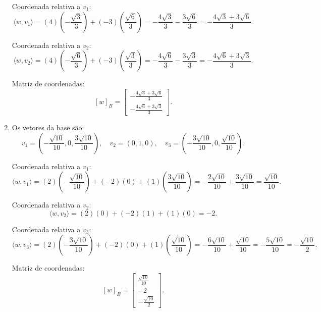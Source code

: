\begin{resolution}
\begin{enumerate}[label=\alph*)]
          Coordenada relativa a \( v_1 \):
          \[
            \langle w, v_1 \rangle = \left(4\right)\left(-\frac{\sqrt{3}}{3}\right) + \left(-3\right)\left(\frac{\sqrt{6}}{3}\right) = -\frac{4\sqrt{3}}{3} - \frac{3\sqrt{6}}{3} = -\frac{4\sqrt{3} + 3\sqrt{6}}{3}.
          \]

          Coordenada relativa a \( v_2 \):
          \[
            \langle w, v_2 \rangle = \left(4\right)\left(-\frac{\sqrt{6}}{3}\right) + \left(-3\right)\left(\frac{\sqrt{3}}{3}\right) = -\frac{4\sqrt{6}}{3} - \frac{3\sqrt{3}}{3} = -\frac{4\sqrt{6} + 3\sqrt{3}}{3}.
          \]

          Matriz de coordenadas:
          \[
            [w]_B = \begin{bmatrix}
              -\frac{4\sqrt{3} + 3\sqrt{6}}{3} \\[8pt]
              -\frac{4\sqrt{6} + 3\sqrt{3}}{3}
            \end{bmatrix}.
          \]

    \item Os vetores da base são:
          \[
            v_1 = \left(-\frac{\sqrt{10}}{10}, 0, \frac{3\sqrt{10}}{10}\right), \quad v_2 = (0, 1, 0), \quad v_3 = \left(-\frac{3\sqrt{10}}{10}, 0, \frac{\sqrt{10}}{10}\right).
          \]

          Coordenada relativa a \( v_1 \):
          \[
            \langle w, v_1 \rangle = \left(2\right)\left(-\frac{\sqrt{10}}{10}\right) + \left(-2\right)(0) + \left(1\right)\left(\frac{3\sqrt{10}}{10}\right) = -\frac{2\sqrt{10}}{10} + \frac{3\sqrt{10}}{10} = \frac{\sqrt{10}}{10}.
          \]

          Coordenada relativa a \( v_2 \):
          \[
            \langle w, v_2 \rangle = \left(2\right)(0) + \left(-2\right)(1) + \left(1\right)(0) = -2.
          \]

          Coordenada relativa a \( v_3 \):
          \[
            \langle w, v_3 \rangle = \left(2\right)\left(-\frac{3\sqrt{10}}{10}\right) + \left(-2\right)(0) + \left(1\right)\left(\frac{\sqrt{10}}{10}\right) = -\frac{6\sqrt{10}}{10} + \frac{\sqrt{10}}{10} = -\frac{5\sqrt{10}}{10} = -\frac{\sqrt{10}}{2}.
          \]

          Matriz de coordenadas:
          \[
            [w]_B = \begin{bmatrix}
              \frac{\sqrt{10}}{10} \\[8pt]
              -2                   \\[8pt]
              -\frac{\sqrt{10}}{2}
            \end{bmatrix}.
          \]

  \end{enumerate}
\end{resolution}

